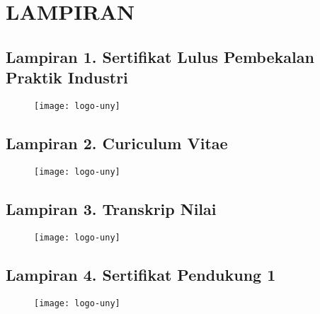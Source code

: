 
\appendix
\chapter*{LAMPIRAN}


\section*{Lampiran 1. Sertifikat Lulus Pembekalan Praktik Industri}
\begin{figure}[H]
	\centering
	\texttt{[image: logo-uny]}
\end{figure}

\newpage

\section*{Lampiran 2. Curiculum Vitae}
\begin{figure}[H]
	\centering
	\texttt{[image: logo-uny]}
\end{figure}

\newpage

\section*{Lampiran 3. Transkrip Nilai}
\begin{figure}[H]
	\centering
	\texttt{[image: logo-uny]}
\end{figure}

\newpage

\section*{Lampiran 4. Sertifikat Pendukung 1}
\begin{figure}[H]
	\centering
	\texttt{[image: logo-uny]}
\end{figure}

